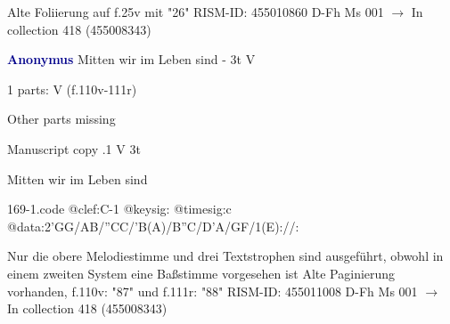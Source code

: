 \documentclass[twocolumn]{book}
\begin{document}
\newline Alte Foliierung auf f.25v mit "26"
\newline RISM-ID: 455010860
\newline D-Fh  Ms 001
\newline $\rightarrow$ In collection 418 (455008343)
      
\newline \par \vspace{7pt} \textcolor{darkblue}{\textbf{Anonymus  }}
\newline Mitten wir im Leben sind - 3t
\newline V
\newline \begin{itshape}\end{itshape} 
\newline \textcolor{darkblue}{}  1 parts: V  (f.110v-111r)
\newline \begin{small} Other parts missing\end{small} 
\newline Manuscript copy
.1  V  3t
\newline \begin{footnotesize} Mitten wir im Leben sind \end{footnotesize}  
\begin{filecontents*}{169-1.code}
@clef:C-1
@keysig:
@timesig:c
@data:2'GG/AB/''CC/'B(A)/B''C/D'A/GF/1(E)://:
\end{filecontents*}
\newline
%

\newline Nur die obere Melodiestimme und drei Textstrophen sind ausgeführt, obwohl in einem zweiten System eine Baßstimme vorgesehen ist
\newline Alte Paginierung vorhanden, f.110v: "87" und f.111r: "88"
\newline RISM-ID: 455011008
\newline D-Fh  Ms 001
\newline $\rightarrow$ In collection 418 (455008343)
      
\end{document}

